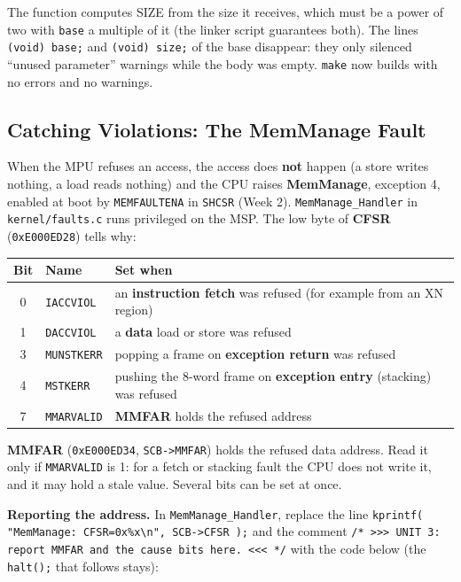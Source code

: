 The function computes SIZE from the size it receives, which must be a power of two with \texttt{base} a multiple of it (the linker script guarantees both). The lines \texttt{(void) base;} and \texttt{(void) size;} of the base disappear: they only silenced ``unused parameter'' warnings while the body was empty. \texttt{make} now builds with no errors and no warnings.

\subsection{Catching Violations: The MemManage Fault}

When the MPU refuses an access, the access does \textbf{not} happen (a store writes nothing, a load reads nothing) and the CPU raises \textbf{MemManage}, exception 4, enabled at boot by \texttt{MEMFAULTENA} in \texttt{SHCSR} (Week 2). \texttt{MemManage\_Handler} in \texttt{kernel/faults.c} runs privileged on the MSP. The low byte of \textbf{CFSR} (\texttt{0xE000ED28}) tells why:

\begin{center}
\begin{tabular}{|c|l|p{7.8cm}|}
\hline
\textbf{Bit} & \textbf{Name} & \textbf{Set when} \\
\hline
0 & \texttt{IACCVIOL}  & an \textbf{instruction fetch} was refused (for example from an XN region) \\
\hline
1 & \texttt{DACCVIOL}  & a \textbf{data} load or store was refused \\
\hline
3 & \texttt{MUNSTKERR} & popping a frame on \textbf{exception return} was refused \\
\hline
4 & \texttt{MSTKERR}   & pushing the 8-word frame on \textbf{exception entry} (stacking) was refused \\
\hline
7 & \texttt{MMARVALID} & \textbf{MMFAR} holds the refused address \\
\hline
\end{tabular}
\end{center}

\textbf{MMFAR} (\texttt{0xE000ED34}, \texttt{SCB->MMFAR}) holds the refused data address. Read it only if \texttt{MMARVALID} is 1: for a fetch or stacking fault the CPU does not write it, and it may hold a stale value. Several bits can be set at once.

\textbf{Reporting the address.} In \texttt{MemManage\_Handler}, replace the line \texttt{kprintf( "MemManage: CFSR=0x\%x\textbackslash n", SCB->CFSR );} and the comment \texttt{/* >>> UNIT 3: report MMFAR and the cause bits here. <<< */} with the code below (the \texttt{halt();} that follows stays):

